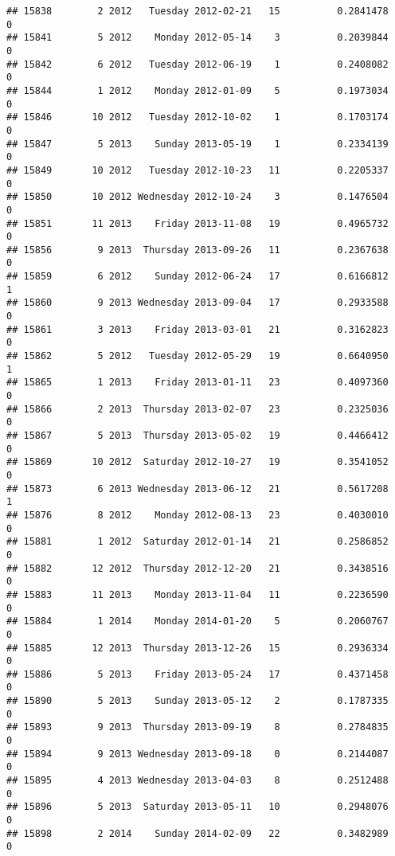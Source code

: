 \documentclass[
]{article}
\begin{document}
\begin{verbatim}
## 15838        2 2012   Tuesday 2012-02-21   15          0.2841478             0
## 15841        5 2012    Monday 2012-05-14    3          0.2039844             0
## 15842        6 2012   Tuesday 2012-06-19    1          0.2408082             0
## 15844        1 2012    Monday 2012-01-09    5          0.1973034             0
## 15846       10 2012   Tuesday 2012-10-02    1          0.1703174             0
## 15847        5 2013    Sunday 2013-05-19    1          0.2334139             0
## 15849       10 2012   Tuesday 2012-10-23   11          0.2205337             0
## 15850       10 2012 Wednesday 2012-10-24    3          0.1476504             0
## 15851       11 2013    Friday 2013-11-08   19          0.4965732             0
## 15856        9 2013  Thursday 2013-09-26   11          0.2367638             0
## 15859        6 2012    Sunday 2012-06-24   17          0.6166812             1
## 15860        9 2013 Wednesday 2013-09-04   17          0.2933588             0
## 15861        3 2013    Friday 2013-03-01   21          0.3162823             0
## 15862        5 2012   Tuesday 2012-05-29   19          0.6640950             1
## 15865        1 2013    Friday 2013-01-11   23          0.4097360             0
## 15866        2 2013  Thursday 2013-02-07   23          0.2325036             0
## 15867        5 2013  Thursday 2013-05-02   19          0.4466412             0
## 15869       10 2012  Saturday 2012-10-27   19          0.3541052             0
## 15873        6 2013 Wednesday 2013-06-12   21          0.5617208             1
## 15876        8 2012    Monday 2012-08-13   23          0.4030010             0
## 15881        1 2012  Saturday 2012-01-14   21          0.2586852             0
## 15882       12 2012  Thursday 2012-12-20   21          0.3438516             0
## 15883       11 2013    Monday 2013-11-04   11          0.2236590             0
## 15884        1 2014    Monday 2014-01-20    5          0.2060767             0
## 15885       12 2013  Thursday 2013-12-26   15          0.2936334             0
## 15886        5 2013    Friday 2013-05-24   17          0.4371458             0
## 15890        5 2013    Sunday 2013-05-12    2          0.1787335             0
## 15893        9 2013  Thursday 2013-09-19    8          0.2784835             0
## 15894        9 2013 Wednesday 2013-09-18    0          0.2144087             0
## 15895        4 2013 Wednesday 2013-04-03    8          0.2512488             0
## 15896        5 2013  Saturday 2013-05-11   10          0.2948076             0
## 15898        2 2014    Sunday 2014-02-09   22          0.3482989             0

\end{verbatim}
\end{document}
